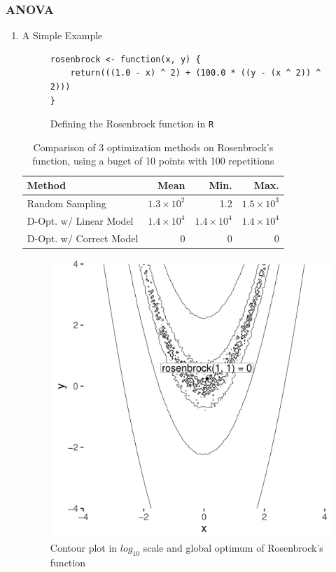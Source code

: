 \documentclass[conference]{IEEEtran}
\begin{document}
\subsubsection{ANOVA}
\label{sec:org0923d11}
\begin{enumerate}
\item A Simple Example
\label{sec:org0f964d5}

\begin{figure}
\lstset{language=r,label= ,caption= ,captionpos=b,numbers=none}
\begin{lstlisting}
rosenbrock <- function(x, y) {
    return(((1.0 - x) ^ 2) + (100.0 * ((y - (x ^ 2)) ^ 2)))
}
\end{lstlisting}
\caption{Defining the Rosenbrock function in \texttt{R}}
\end{figure}

\begin{table}[ht]
\centering
\caption{Comparison of 3 optimization methods on Rosenbrock's function, using a buget of 10 points with 100 repetitions}
\begingroup\small
\begin{tabular}{lrrr}
  \toprule
Method & Mean & Min. & Max. \\
  \midrule
Random Sampling & $1.3 \times 10^{2}$ & 1.2 & $1.5 \times 10^{3}$ \\
  D-Opt. w/ Linear Model & $1.4 \times 10^{4}$ & $1.4 \times 10^{4}$ & $1.4 \times 10^{4}$ \\
  D-Opt. w/ Correct Model &   0 &   0 &   0 \\
   \bottomrule
\end{tabular}
\endgroup
\end{table}

\begin{center}
\begin{figure}
\begin{center}
\includegraphics[width=.8\columnwidth]{./img/rosenbrock.pdf}
\end{center}
\caption{Contour plot in \(log_{10}\) scale and global optimum of Rosenbrock's function}
\end{figure}
\end{center}


\end{enumerate}
\end{document}
